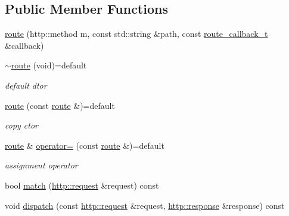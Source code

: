 \subsection*{Public Member Functions}
\begin{DoxyCompactItemize}
\item 
\hyperlink{classnetflex_1_1routing_1_1route_a15868bae2313eaf230380fbb6266a153}{route} (http\+::method m, const std\+::string \&path, const \hyperlink{classnetflex_1_1routing_1_1route_a5af1479be27de20f7c395bf2fb0f3639}{route\+\_\+callback\+\_\+t} \&callback)
\item 
\mbox{\label{classnetflex_1_1routing_1_1route_a0e68b4ef51fecfe72e80f068d79ec360}} 
\hyperlink{classnetflex_1_1routing_1_1route_a0e68b4ef51fecfe72e80f068d79ec360}{$\sim$route} (void)=default
\begin{DoxyCompactList}\small\item\em default dtor \end{DoxyCompactList}\item 
\mbox{\label{classnetflex_1_1routing_1_1route_acb3c4755a0dc9b5385ac54a0ef75a4f4}} 
\hyperlink{classnetflex_1_1routing_1_1route_acb3c4755a0dc9b5385ac54a0ef75a4f4}{route} (const \hyperlink{classnetflex_1_1routing_1_1route}{route} \&)=default
\begin{DoxyCompactList}\small\item\em copy ctor \end{DoxyCompactList}\item 
\mbox{\label{classnetflex_1_1routing_1_1route_a4c7f2bfd6148ef3d2137f01150cbdeef}} 
\hyperlink{classnetflex_1_1routing_1_1route}{route} \& \hyperlink{classnetflex_1_1routing_1_1route_a4c7f2bfd6148ef3d2137f01150cbdeef}{operator=} (const \hyperlink{classnetflex_1_1routing_1_1route}{route} \&)=default
\begin{DoxyCompactList}\small\item\em assignment operator \end{DoxyCompactList}\item 
bool \hyperlink{classnetflex_1_1routing_1_1route_a2c02cde61aeaae8fc15ea3fc316e9bee}{match} (\hyperlink{classnetflex_1_1http_1_1request}{http\+::request} \&request) const
\item 
void \hyperlink{classnetflex_1_1routing_1_1route_a7f36c264c33c928298900e217291bc5c}{dispatch} (const \hyperlink{classnetflex_1_1http_1_1request}{http\+::request} \&request, \hyperlink{classnetflex_1_1http_1_1response}{http\+::response} \&response) const
\end{DoxyCompactItemize}


